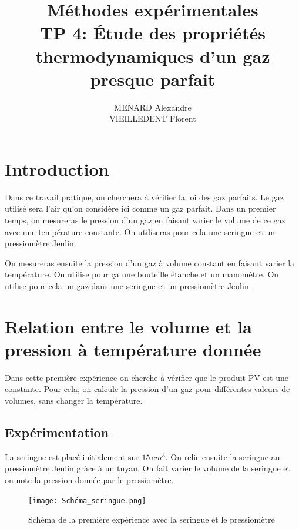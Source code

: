 \documentclass[12pt]{article}
\title{\textbf{Méthodes expérimentales} \\ TP 4: Étude des propriétés thermodynamiques d'un gaz presque parfait}
\author{MENARD Alexandre \\ VIEILLEDENT Florent}
\begin{document}
\maketitle

\section*{Introduction}
Dans ce travail pratique, on cherchera à vérifier la loi des gaz parfaits. Le gaz utilisé sera l'air qu'on considère ici comme un gaz parfait. Dans un premier temps, on mesureras le pression d'un gaz en faisant varier le volume de ce gaz avec une température constante. On utiliseras pour cela une seringue et un pressiomètre Jeulin. 

On mesureras ensuite la pression d'un gaz à volume constant en faisant varier la température. On utilise pour ça une bouteille étanche et un manomètre. On utilise pour cela un gaz dans une seringue et un pressiomètre Jeulin. 





\newpage

\section{Relation entre le volume et la pression à température donnée}

Dans cette première expérience on cherche à vérifier que le produit PV est une constante. Pour cela, on calcule la pression d'un gaz pour différentes valeurs de volumes, sans changer la température. 	

\subsection{Expérimentation}

La seringue est placé initialement sur $15\, cm^3$. On relie ensuite la seringue au pressiomètre Jeulin gràce à un tuyau. On fait varier le volume de la seringue et on note la pression donnée par le pressiomètre. 

\begin{figure}[!h]
	\begin{center}
		\texttt{[image: Schéma\_seringue.png]}
		\label{Schéma_seringue}
		\caption{Schéma de la première expérience avec la seringue et le pressiomètre}
	\end{center}
\end{figure}
\end{document}
